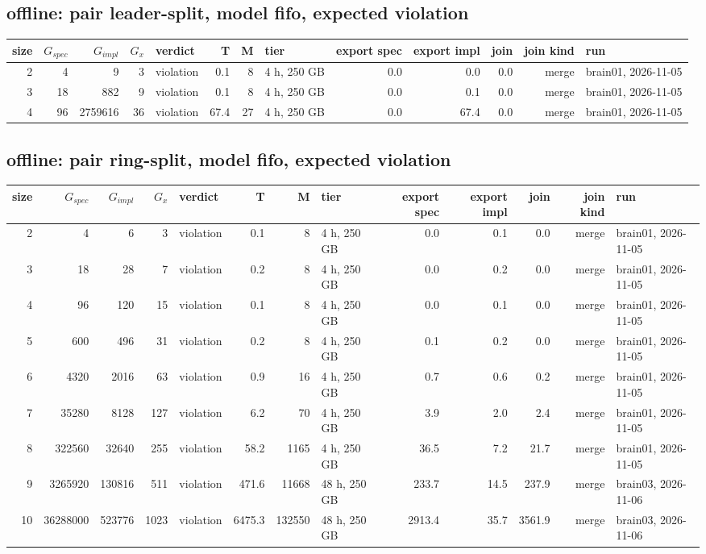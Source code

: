 \documentclass[10pt]{article}
\begin{document}
\subsection*{offline: pair \textsf{leader-split}, model fifo, expected violation}
\begin{longtable}{@{}rrrrlrrlrrrrl@{}}
\toprule
size & $G_{\mathit{spec}}$ & $G_{\mathit{impl}}$ & $G_x$ & verdict & T & M & tier & export spec & export impl & join & join kind & run \\
\midrule
\endhead
\color{blue} 2 & 4 & 9 & 3 & violation & 0.1 & 8 & 4 h, 250 GB & 0.0 & 0.0 & 0.0 & merge & brain01, 2026-11-05 \\
\color{blue} 3 & 18 & 882 & 9 & violation & 0.1 & 8 & 4 h, 250 GB & 0.0 & 0.1 & 0.0 & merge & brain01, 2026-11-05 \\
\color{blue} 4 & 96 & 2759616 & 36 & violation & 67.4 & 27 & 4 h, 250 GB & 0.0 & 67.4 & 0.0 & merge & brain01, 2026-11-05 \\
\bottomrule
\end{longtable}
\subsection*{offline: pair \textsf{ring-split}, model fifo, expected violation}
\begin{longtable}{@{}rrrrlrrlrrrrl@{}}
\toprule
size & $G_{\mathit{spec}}$ & $G_{\mathit{impl}}$ & $G_x$ & verdict & T & M & tier & export spec & export impl & join & join kind & run \\
\midrule
\endhead
\color{blue} 2 & 4 & 6 & 3 & violation & 0.1 & 8 & 4 h, 250 GB & 0.0 & 0.1 & 0.0 & merge & brain01, 2026-11-05 \\
\color{blue} 3 & 18 & 28 & 7 & violation & 0.2 & 8 & 4 h, 250 GB & 0.0 & 0.2 & 0.0 & merge & brain01, 2026-11-05 \\
\color{blue} 4 & 96 & 120 & 15 & violation & 0.1 & 8 & 4 h, 250 GB & 0.0 & 0.1 & 0.0 & merge & brain01, 2026-11-05 \\
\color{blue} 5 & 600 & 496 & 31 & violation & 0.2 & 8 & 4 h, 250 GB & 0.1 & 0.2 & 0.0 & merge & brain01, 2026-11-05 \\
\color{blue} 6 & 4320 & 2016 & 63 & violation & 0.9 & 16 & 4 h, 250 GB & 0.7 & 0.6 & 0.2 & merge & brain01, 2026-11-05 \\
\color{blue} 7 & 35280 & 8128 & 127 & violation & 6.2 & 70 & 4 h, 250 GB & 3.9 & 2.0 & 2.4 & merge & brain01, 2026-11-05 \\
\color{blue} 8 & 322560 & 32640 & 255 & violation & 58.2 & 1165 & 4 h, 250 GB & 36.5 & 7.2 & 21.7 & merge & brain01, 2026-11-05 \\
\color{blue} 9 & 3265920 & 130816 & 511 & violation & 471.6 & 11668 & 48 h, 250 GB & 233.7 & 14.5 & 237.9 & merge & brain03, 2026-11-06 \\
\color{blue} 10 & 36288000 & 523776 & 1023 & violation & 6475.3 & 132550 & 48 h, 250 GB & 2913.4 & 35.7 & 3561.9 & merge & brain03, 2026-11-06 \\
\bottomrule
\end{longtable}
\end{document}

